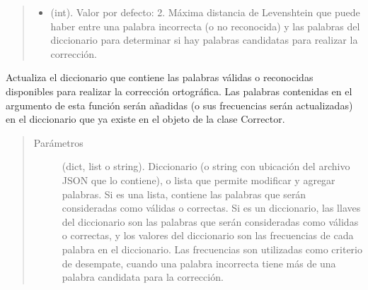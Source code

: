 \documentclass[letterpaper,10pt,openany,spanish]{sphinxmanual}
\begin{document}
\begin{fulllineitems}
\begin{quote}
\begin{description}
\begin{itemize}
\item {} 
 \textendash{} (int). Valor por defecto: 2. Máxima distancia de Levenshtein que puede haber 
entre una palabra incorrecta (o no reconocida) y las palabras del diccionario para             determinar si hay palabras candidatas para realizar la corrección.

\end{itemize}

\end{description}\end{quote}

\begin{fulllineitems}
\label{\detokenize{funciones/correccion:correccion.Corrector.actualizar_diccionario}}
Actualiza el diccionario que contiene las palabras válidas o reconocidas disponibles para             realizar la corrección ortográfica. Las palabras contenidas en el argumento              de esta función serán añadidas (o sus frecuencias serán actualizadas) en el diccionario             que ya existe en el objeto de la clase Corrector.
\begin{quote}\begin{description}
\item[{Parámetros}] \leavevmode
{} \textendash{} (dict, list o string). Diccionario (o string con ubicación del             archivo JSON que lo contiene), o lista que permite modificar y agregar palabras.             Si es una lista, contiene las palabras que serán consideradas como válidas o correctas.             Si es un diccionario, las llaves del diccionario son las palabras que serán consideradas
como válidas o correctas, y los valores del diccionario son las frecuencias de cada palabra             en el diccionario. Las frecuencias son utilizadas como criterio de desempate, cuando una             palabra incorrecta tiene más de una palabra candidata para la corrección.

\end{description}\end{quote}

\end{fulllineitems}


\end{fulllineitems}
\end{document}
